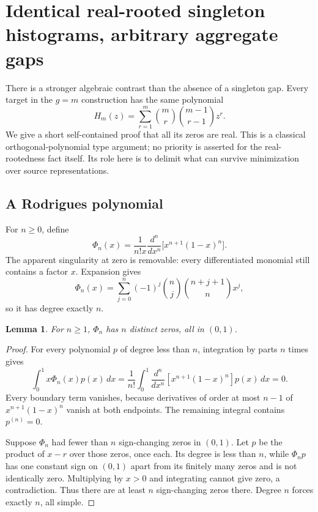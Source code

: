 \documentclass[11pt,letterpaper]{article}
\newtheorem{lemma}[theorem]{Lemma}
\theoremstyle{definition}\newtheorem{definition}[theorem]{Definition}
\theoremstyle{remark}\newtheorem{remark}[theorem]{Remark}
\theoremstyle{definition}\newtheorem{question}[theorem]{Question}
\begin{document}
\section{Identical real-rooted singleton histograms, arbitrary aggregate gaps}
\label{ids:bp:sec:roots}

There is a stronger algebraic contrast than the absence of a singleton gap.
Every target in the $g=m$ construction has the same polynomial
\begin{equation}
 H_m(z)=\sum_{r=1}^m\binom mr\binom{m-1}{r-1}z^r.
 \label{ids:bp:eq:H}
\end{equation}
We give a short self-contained proof that all its zeros are real. This is a
classical orthogonal-polynomial type argument; no priority is asserted for
the real-rootedness fact itself. Its role here is to delimit what can survive
minimization over source representations.

\subsection{A Rodrigues polynomial}
For $n\geq0$, define
\begin{equation}
 \Phi_n(x)=\frac{1}{n!x}\frac{d^n}{dx^n}
                  \bigl[x^{n+1}(1-x)^n\bigr].
 \label{ids:bp:eq:Rodrigues}
\end{equation}
The apparent singularity at zero is removable: every differentiated monomial
still contains a factor $x$. Expansion gives
\begin{equation}
 \Phi_n(x)=\sum_{j=0}^n(-1)^j\binom nj\binom{n+j+1}{n}x^j,
 \label{ids:bp:eq:J-expansion}
\end{equation}
so it has degree exactly $n$.

\begin{lemma}
\label{ids:bp:lem:orthogonal}
For $n\geq1$, $\Phi_n$ has $n$ distinct zeros, all in $(0,1)$.
\end{lemma}
\begin{proof}
For every polynomial $p$ of degree less than $n$, integration by parts $n$
times gives
\[
 \int_0^1 x\Phi_n(x)p(x)\,dx
 =\frac1{n!}\int_0^1
      \frac{d^n}{dx^n}[x^{n+1}(1-x)^n]p(x)\,dx=0.
\]
Every boundary term vanishes, because derivatives of order at most $n-1$
of $x^{n+1}(1-x)^n$ vanish at both endpoints. The remaining integral contains
$p^{(n)}=0$.

Suppose $\Phi_n$ had fewer than $n$ sign-changing zeros in $(0,1)$. Let $p$ be
the product of $x-r$ over those zeros, once each. Its degree is less than
$n$, while $\Phi_np$ has one constant sign on $(0,1)$ apart from its finitely
many zeros and is not identically zero. Multiplying by $x>0$ and integrating
cannot give zero, a contradiction. Thus there are at least $n$ sign-changing
zeros there. Degree $n$ forces exactly $n$, all simple.
\end{proof}
\end{document}
